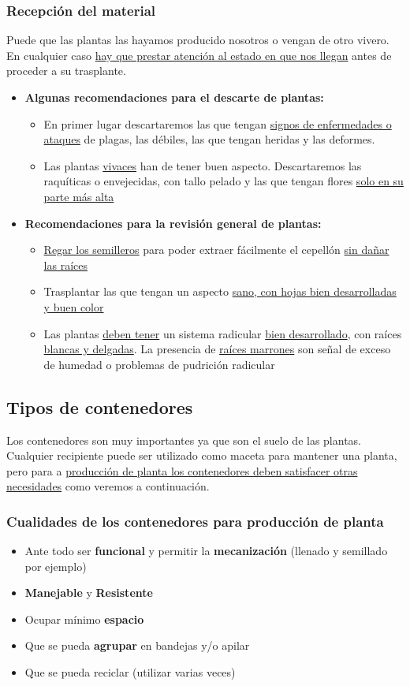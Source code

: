 \documentclass[a4paper,12pt,oneside]{article}
\begin{document}
\subsubsection{Recepción del material}
\label{sec:orgc4b3970}
Puede que las plantas las hayamos producido nosotros o vengan de otro
vivero. En cualquier caso \uline{hay que prestar atención al estado en que nos
llegan} antes de proceder a su trasplante.
\begin{itemize}
\item \textbf{Algunas recomendaciones para el descarte de plantas:}
\begin{itemize}
\item En primer lugar descartaremos las que tengan \uline{signos de enfermedades o ataques}
de plagas, las débiles, las que tengan heridas y las deformes.
\item Las plantas \uline{vivaces} han de tener buen aspecto. Descartaremos las raquíticas
o envejecidas, con tallo pelado y las que tengan flores \uline{solo en su parte más
alta}
\end{itemize}
\item \textbf{Recomendaciones para la revisión general de plantas:}
\begin{itemize}
\item \uline{Regar los semilleros} para poder extraer fácilmente el cepellón \uline{sin dañar
las raíces}
\item Trasplantar las que tengan un aspecto \uline{sano, con hojas bien desarrolladas
y buen color}
\item Las plantas \uline{deben tener} un sistema radicular \uline{bien desarrollado}, con
raíces \uline{blancas y delgadas}. La presencia de \uline{raíces marrones} son señal de
exceso de humedad o problemas de pudrición radicular
\end{itemize}
\end{itemize}
\subsection{Tipos de contenedores}
\label{sec:org6277c0a}
Los contenedores son muy importantes ya que son el suelo de las
plantas. Cualquier recipiente puede ser utilizado como maceta para mantener una
planta, pero para a \uline{producción de planta los contenedores deben satisfacer
otras necesidades} como veremos a continuación.
\subsubsection{Cualidades de los contenedores para producción de planta}
\label{sec:org606c818}
\begin{itemize}
\item Ante todo ser \textbf{funcional} y permitir la \textbf{mecanización} (llenado y semillado
por ejemplo)
\item \textbf{Manejable} y \textbf{Resistente}
\item Ocupar mínimo \textbf{espacio}
\item Que se pueda \textbf{agrupar} en bandejas y/o apilar
\item Que se pueda reciclar (utilizar varias veces)
\end{itemize}
\end{document}
